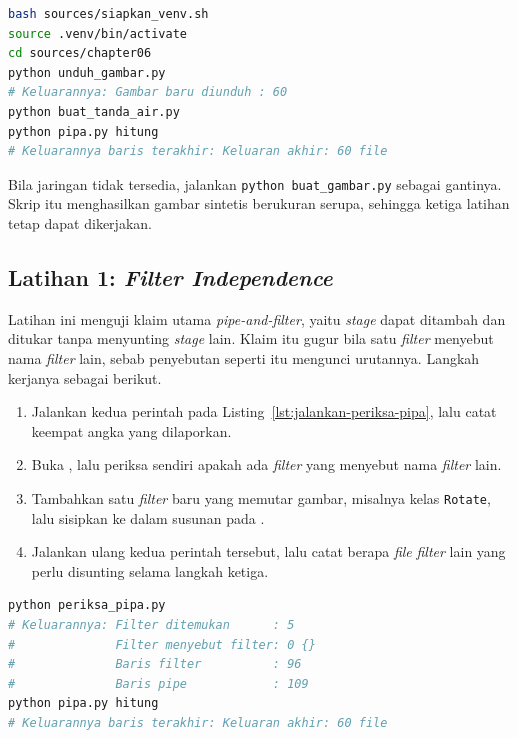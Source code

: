 \begin{lstlisting}[language=bash, caption={Menyiapkan bahan sebelum ketiga
  latihan, seluruh skrip tersedia di \berkas{sources/chapter06/}},
  label=lst:venv-ch06]
bash sources/siapkan_venv.sh
source .venv/bin/activate
cd sources/chapter06
python unduh_gambar.py
# Keluarannya: Gambar baru diunduh : 60
python buat_tanda_air.py
python pipa.py hitung
# Keluarannya baris terakhir: Keluaran akhir: 60 file
\end{lstlisting}

Bila jaringan tidak tersedia, jalankan \texttt{python buat\_gambar.py} sebagai
gantinya. Skrip itu menghasilkan gambar sintetis berukuran serupa, sehingga
ketiga latihan tetap dapat dikerjakan.

\subsection*{Latihan 1: \textit{Filter Independence}}

Latihan ini menguji klaim utama \textit{pipe-and-filter}, yaitu \textit{stage} dapat
ditambah dan ditukar tanpa menyunting \textit{stage} lain. Klaim itu gugur bila satu
\textit{filter} menyebut nama \textit{filter} lain, sebab penyebutan seperti itu mengunci
urutannya. Langkah kerjanya sebagai berikut.

\begin{enumerate}
  \item Jalankan kedua perintah pada Listing~\ref{lst:jalankan-periksa-pipa},
    lalu catat keempat angka yang dilaporkan.
  \item Buka , lalu periksa sendiri
    apakah ada \textit{filter} yang menyebut nama \textit{filter} lain.
  \item Tambahkan satu \textit{filter} baru yang memutar gambar, misalnya kelas
    \texttt{Rotate}, lalu sisipkan ke dalam susunan pada
    .
  \item Jalankan ulang kedua perintah tersebut, lalu catat berapa \textit{file}
    \textit{filter} lain yang perlu disunting selama langkah ketiga.
\end{enumerate}

\begin{lstlisting}[language=bash, caption={Memeriksa \textit{filter
  independence}, skrip tersedia di \berkas{sources/chapter06/periksa_pipa.py}},
  label=lst:jalankan-periksa-pipa]
python periksa_pipa.py
# Keluarannya: Filter ditemukan      : 5
#              Filter menyebut filter: 0 {}
#              Baris filter          : 96
#              Baris pipe            : 109
python pipa.py hitung
# Keluarannya baris terakhir: Keluaran akhir: 60 file
\end{lstlisting}

